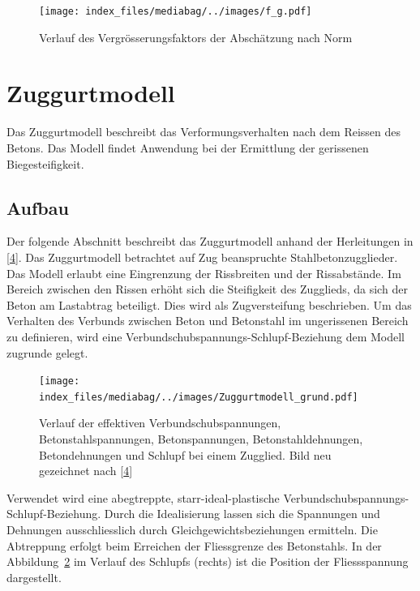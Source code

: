 \documentclass[
  12pt,
  letterpaper,
  egregdoesnotlikesansseriftitles]{scrreprt}
\begin{document}
\begin{figure}[H]

{\centering \texttt{[image: index\_files/mediabag/../images/f\_g.pdf]}

}

\caption{\label{fig-fg}Verlauf des Vergrösserungsfaktors der Abschätzung
nach Norm}

\end{figure}

\hypertarget{sec-zuggurtmodell}{%
\section{Zuggurtmodell}\label{sec-zuggurtmodell}}

Das Zuggurtmodell beschreibt das Verformungsverhalten nach dem Reissen
des Betons. Das Modell findet Anwendung bei der Ermittlung der
gerissenen Biegesteifigkeit.

\hypertarget{aufbau-2}{%
\subsection{Aufbau}\label{aufbau-2}}

Der folgende Abschnitt beschreibt das Zuggurtmodell anhand der
Herleitungen in {[}\protect\hyperlink{ref-Spathelf2022}{4}{]}. Das
Zuggurtmodell betrachtet auf Zug beanspruchte Stahlbetonzugglieder. Das
Modell erlaubt eine Eingrenzung der Rissbreiten und der Rissabstände. Im
Bereich zwischen den Rissen erhöht sich die Steifigkeit des Zugglieds,
da sich der Beton am Lastabtrag beteiligt. Dies wird als Zugversteifung
beschrieben. Um das Verhalten des Verbunds zwischen Beton und Betonstahl
im ungerissenen Bereich zu definieren, wird eine
Verbundschubspannungs-Schlupf-Beziehung dem Modell zugrunde gelegt.

\begin{figure}[H]

{\centering \texttt{[image: index\_files/mediabag/../images/Zuggurtmodell\_grund.pdf]}

}

\caption{\label{fig-zuggurtmodell}Verlauf der effektiven
Verbundschubspannungen, Betonstahlspannungen, Betonspannungen,
Betonstahldehnungen, Betondehnungen und Schlupf bei einem Zugglied. Bild
neu gezeichnet nach {[}\protect\hyperlink{ref-Spathelf2022}{4}{]}}

\end{figure}

Verwendet wird eine abegtreppte, starr-ideal-plastische
Verbundschubspannungs-Schlupf-Beziehung. Durch die Idealisierung lassen
sich die Spannungen und Dehnungen ausschliesslich durch
Gleichgewichtsbeziehungen ermitteln. Die Abtreppung erfolgt beim
Erreichen der Fliessgrenze des Betonstahls. In der
Abbildung~\ref{fig-zuggurtmodell} im Verlauf des Schlupfs (rechts) ist
die Position der Fliessspannung dargestellt.
\end{document}
